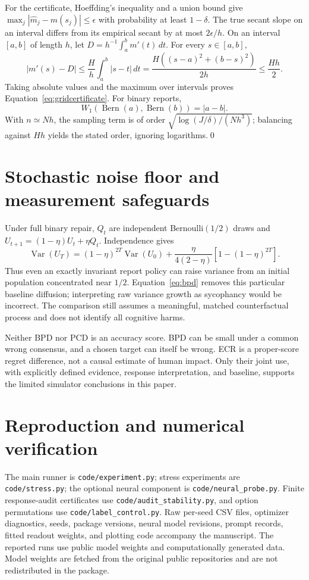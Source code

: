 \documentclass[10pt]{article}
\newcommand{\Var}{\operatorname{Var}}
\begin{document}
For the certificate, Hoeffding's inequality and a union bound give
$\max_j|\widehat m_j-m(s_j)|\le\epsilon$ with probability at least
$1-\delta$. The true secant slope on an interval differs from its empirical secant by
at most $2\epsilon/h$. On an interval $[a,b]$ of length $h$, let
$D=h^{-1}\int_a^b m'(t)\,dt$. For every $s\in[a,b]$,
\[
 |m'(s)-D|\le\frac{H}{h}\int_a^b|s-t|\,dt
 =\frac{H((s-a)^2+(b-s)^2)}{2h}\le\frac{Hh}{2}.
\]
Taking absolute values and the maximum over intervals proves
Equation~\eqref{eq:gridcertificate}. For binary
reports,\[W_1(\operatorname{Bern}(a),\operatorname{Bern}(b))=|a-b|.\]
With $n\simeq Nh$, the sampling term is of order
$\sqrt{\log(J/\delta)/(Nh^3)}$; balancing against $Hh$ yields the stated
order, ignoring logarithms.\qed

\section{Stochastic noise floor and measurement safeguards}
Under full binary repair, $Q_t$ are independent Bernoulli$(1/2)$ draws
and $U_{t+1}=(1-\eta)U_t+\eta Q_t$. Independence gives
\begin{equation}
 \Var(U_T)=(1-\eta)^{2T}\Var(U_0)+
 \frac{\eta}{4(2-\eta)}[1-(1-\eta)^{2T}].
\end{equation}
Thus even an exactly invariant report policy can raise variance from an
initial population concentrated near $1/2$. Equation~\eqref{eq:bpd} removes
this particular baseline diffusion; interpreting raw variance growth as
sycophancy would be incorrect. The comparison still assumes a meaningful,
matched counterfactual process and does not identify all cognitive harms.

Neither BPD nor PCD is an accuracy score. BPD can be small under a common
wrong consensus, and a chosen target can itself be wrong. ECR is a proper-score
regret difference, not a causal estimate of human impact. Only their joint
use, with explicitly defined evidence, response interpretation, and baseline,
supports the limited simulator conclusions in this paper.

\section{Reproduction and numerical verification}\label{app:repro}
The main runner is \texttt{code/experiment.py}; stress experiments are
\texttt{code/stress.py}; the optional neural component is
\texttt{code/neural\_probe.py}. Finite response-audit certificates use
\texttt{code/audit\_stability.py}, and option permutations use
\texttt{code/label\_control.py}. Raw per-seed CSV files, optimizer diagnostics,
seeds, package versions, neural model revisions, prompt records, fitted
readout weights, and plotting code accompany the manuscript. The reported runs use public model weights and computationally generated data. Model weights are fetched from the original public repositories and
are not redistributed in the package.
\end{document}
